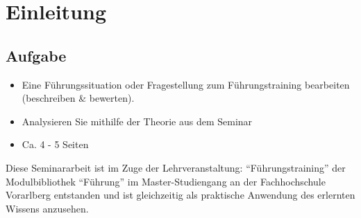 \chapter{Einleitung}
\label{chap:einleitung}

\section*{Aufgabe}
\begin{itemize}
\item Eine Führungssituation oder Fragestellung zum Führungstraining bearbeiten (beschreiben \& bewerten).
\item Analysieren Sie mithilfe der Theorie aus dem Seminar
\item Ca. 4 - 5 Seiten
\end{itemize}



Diese Seminararbeit ist im Zuge der Lehrveranstaltung: "`Führungstraining"' der Modulbibliothek "`Führung"' im Master-Studiengang an der Fachhochschule Vorarlberg entstanden und ist gleichzeitig als praktische Anwendung des erlernten Wissens anzusehen. 